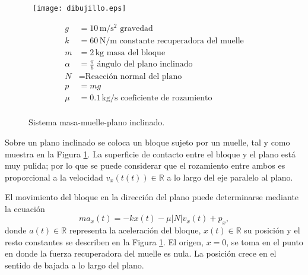 \begin{figure}[h]
\begin{minipage}{0.5\textwidth} \ 
\texttt{[image: dibujillo.eps]}
\end{minipage}
\begin{minipage}{0.5\textwidth}
\begin{align*}
g &= 10 \, \text{m}/\text{s}^2 \text{\ gravedad}\\
k &= 60 \, \text{N}/\text{m} \text{\ constante recuperadora del muelle}\\
m &= 2 \, \text{kg} \text{\ masa del bloque}\\
\alpha &= \frac{\pi}{6} \text{\ ángulo del plano inclinado}\\
N &= \text{Reacción normal del plano}\\
p &= mg\\
	\mu &= 0.1 \, \text{kg}/\text{s} \text{\ coeficiente de rozamiento}\\
\end{align*}

\end{minipage}
\caption{Sistema masa-muelle-plano inclinado.}
\label{fig1}
\end{figure}

Sobre un plano inclinado se coloca un bloque sujeto por un muelle, tal y como muestra en la Figura \ref{fig1}. La superficie de contacto entre el bloque y el plano está muy pulida; por lo que se puede considerar que el rozamiento entre ambos es proporcional a la velocidad $v_x(t(t))\in\mathbb{R}$ a lo largo del eje paralelo al plano.

El movimiento del bloque en la dirección del plano puede determinarse mediante la ecuación
\begin{equation}
	ma_{x}(t) = -kx(t) -\mu \lvert N \lvert v_x(t) + p_x, \label{eq: f}
\end{equation}
donde $a(t)\in\mathbb{R}$ representa la aceleración del bloque, $x(t)\in\mathbb{R}$ su posición y el resto constantes se describen en la Figura \ref{fig1}. El origen, $x=0$, se toma en el punto en donde la fuerza recuperadora del muelle es nula. La posición crece en el sentido de bajada a lo largo del plano.

